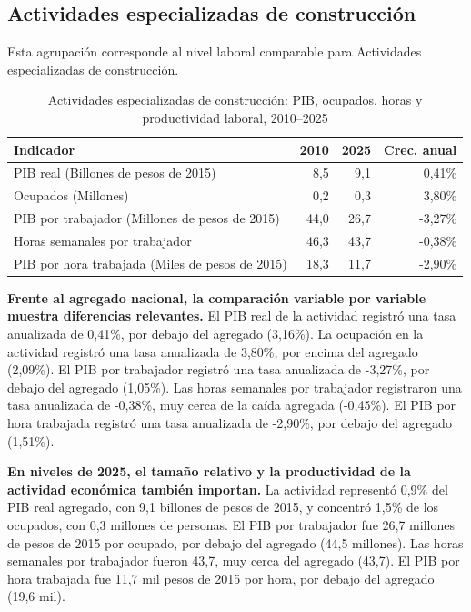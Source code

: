 \subsection{Actividades especializadas de construcción}

Esta agrupación corresponde al nivel laboral comparable para Actividades especializadas de construcción.

\begin{table}[H]
\centering
\caption{Actividades especializadas de construcción: PIB, ocupados, horas y productividad laboral, 2010--2025}
\label{tab:agg25_f03_productividad}
\small
\begin{tabular}{lrrr}
\toprule
Indicador & 2010 & 2025 & Crec. anual \\
\midrule
PIB real  (Billones de pesos de 2015) & 8,5 & 9,1 & 0,41\% \\
Ocupados (Millones) & 0,2 & 0,3 & 3,80\% \\
PIB por trabajador (Millones de pesos de 2015) & 44,0 & 26,7 & -3,27\% \\
Horas semanales por trabajador & 46,3 & 43,7 & -0,38\% \\
PIB por hora trabajada (Miles de pesos de 2015) & 18,3 & 11,7 & -2,90\% \\
\bottomrule
\end{tabular}
\end{table}

\textbf{Frente al agregado nacional, la comparación variable por variable muestra diferencias relevantes.} El PIB real de la actividad registró una tasa anualizada de 0,41\%, por debajo del agregado (3,16\%). La ocupación en la actividad registró una tasa anualizada de 3,80\%, por encima del agregado (2,09\%). El PIB por trabajador registró una tasa anualizada de -3,27\%, por debajo del agregado (1,05\%). Las horas semanales por trabajador registraron una tasa anualizada de -0,38\%, muy cerca de la caída agregada (-0,45\%). El PIB por hora trabajada registró una tasa anualizada de -2,90\%, por debajo del agregado (1,51\%).

\textbf{En niveles de 2025, el tamaño relativo y la productividad de la actividad económica también importan.} La actividad representó 0,9\% del PIB real agregado, con 9,1 billones de pesos de 2015, y concentró 1,5\% de los ocupados, con 0,3 millones de personas. El PIB por trabajador fue 26,7 millones de pesos de 2015 por ocupado, por debajo del agregado (44,5 millones). Las horas semanales por trabajador fueron 43,7, muy cerca del agregado (43,7). El PIB por hora trabajada fue 11,7 mil pesos de 2015 por hora, por debajo del agregado (19,6 mil).

